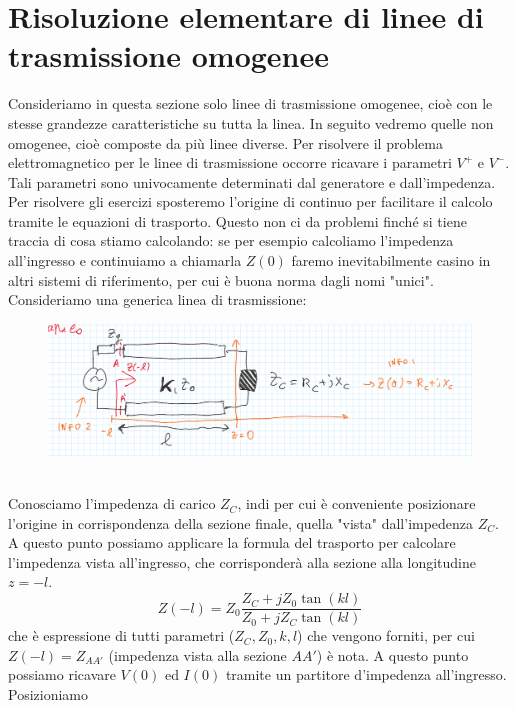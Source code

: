 \documentclass{book}
\begin{document}
    \section{Risoluzione elementare di linee di trasmissione omogenee}
        Consideriamo in questa sezione solo linee di trasmissione omogenee, cioè con le stesse grandezze 
        caratteristiche su tutta la linea. In seguito vedremo quelle non omogenee, cioè composte da più linee diverse.
        Per risolvere il problema elettromagnetico per le linee di trasmissione occorre ricavare i parametri
        $V^{+}$ e $V^{-}$. Tali parametri sono univocamente determinati dal generatore e dall'impedenza.
        Per risolvere gli esercizi sposteremo l'origine di continuo per facilitare il calcolo tramite le equazioni di trasporto.
        Questo non ci da problemi finché si tiene traccia di cosa stiamo calcolando: se per esempio calcoliamo l'impedenza all'ingresso e 
        continuiamo a chiamarla $Z(0)$ faremo inevitabilmente casino in altri sistemi di riferimento, per cui è buona norma dagli 
        nomi "unici". \\
        Consideriamo una generica linea di trasmissione:
        \begin{figure}[h!]
            \center 
            \includegraphics[width=0.75\linewidth]{Chapter_two/Chapt2img8.png}
        \end{figure}
        \\ Conosciamo l'impedenza di carico $Z_{C}$, indi per cui è conveniente posizionare l'origine in corrispondenza
        della sezione finale, quella "vista" dall'impedenza $Z_{C}$. A questo punto possiamo
        applicare la formula del trasporto per calcolare l'impedenza vista all'ingresso, che corrisponderà alla sezione 
        alla longitudine $z=-l$.
        \begin{equation}
            Z(-l)  = Z_{0} \frac{Z_{C}+jZ_{0}\tan(k l)}{Z_{0}+j Z_{C}\tan(kl)}
        \end{equation}
        che è espressione di tutti parametri ($Z_{C}, Z_{0}, k, l$) che vengono forniti, per cui
        $Z(-l) = Z_{AA'}$ (impedenza vista alla sezione $AA'$) è nota.
        A questo punto possiamo ricavare $V(0)$ ed $I(0)$ tramite un partitore d'impedenza all'ingresso. Posizioniamo
\end{document}
